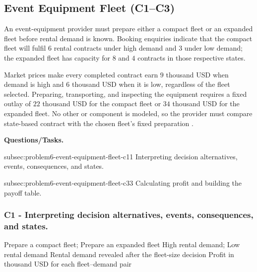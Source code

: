
	\subsection{Event Equipment Fleet (C1--C3)}
	\label{sec:problem6-event-equipment-fleet-c1-c3}

	An event-equipment provider must prepare either a compact fleet or an expanded fleet before rental demand is known. Booking enquiries indicate that the compact fleet will fulfil \(6\) rental contracts under high demand and \(3\) under low demand; the expanded fleet has capacity for \(8\) and \(4\) contracts in those respective states.

	Market prices make every completed contract earn \(9\) thousand USD when demand is high and \(6\) thousand USD when it is low, regardless of the fleet selected. Preparing, transporting, and inspecting the equipment requires a fixed outlay of \(22\) thousand USD for the compact fleet or \(34\) thousand USD for the expanded fleet. No other  or  component is modeled, so the provider must compare state-based contract  with the chosen fleet's fixed preparation .

	\textbf{Questions/Tasks.}
	\begin{enumerate}
		\CriterionTask
		{subsec:problem6-event-equipment-fleet-c1}{1}
		{Interpreting decision alternatives, events, consequences, and states.}

		\CriterionTask
		{subsec:problem6-event-equipment-fleet-c3}{3}
		{Calculating profit and building the payoff table.}
	\end{enumerate}

	\subsubsection*{C1 - Interpreting decision alternatives, events, consequences, and states.}
	\label{subsec:problem6-event-equipment-fleet-c1}

	\DecisionElementsTable
	{Prepare a compact fleet; Prepare an expanded fleet}
	{High rental demand; Low rental demand}
	{Rental demand revealed after the fleet-size decision}
	{Profit in thousand USD for each fleet--demand pair}

